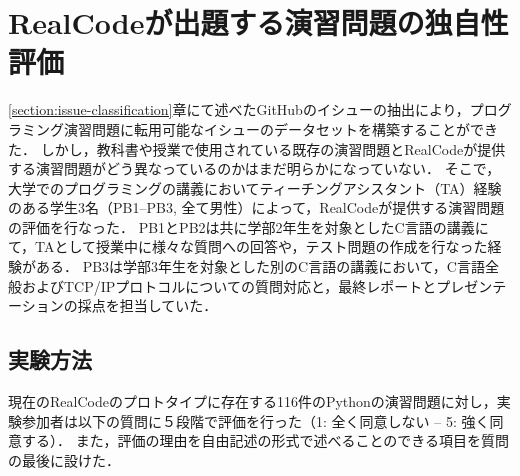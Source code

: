 \chapter{RealCodeが出題する演習問題の独自性評価}
\graphicspath{{Chapters_evaluation/Figs/}}
\label{section:ta_evaluation}

\ref{section:issue-classification}章にて述べたGitHubのイシューの抽出により，プログラミング演習問題に転用可能なイシューのデータセットを構築することができた．
しかし，教科書や授業で使用されている既存の演習問題とRealCodeが提供する演習問題がどう異なっているのかはまだ明らかになっていない．
そこで，大学でのプログラミングの講義においてティーチングアシスタント（TA）経験のある学生3名（PB1--PB3, 全て男性）によって，RealCodeが提供する演習問題の評価を行なった．
PB1とPB2は共に学部2年生を対象としたC言語の講義にて，TAとして授業中に様々な質問への回答や，テスト問題の作成を行なった経験がある．
PB3は学部3年生を対象とした別のC言語の講義において，C言語全般およびTCP/IPプロトコルについての質問対応と，最終レポートとプレゼンテーションの採点を担当していた．


\section{実験方法}
現在のRealCodeのプロトタイプに存在する116件のPythonの演習問題に対し，実験参加者は以下の質問に５段階で評価を行った（1: 全く同意しない -- 5: 強く同意する）．
また，評価の理由を自由記述の形式で述べることのできる項目を質問の最後に設けた．


